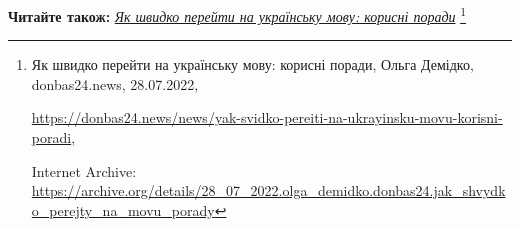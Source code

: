  
 
 
 
 


\textbf{Читайте також:} \href{https://archive.org/details/28_07_2022.olga_demidko.donbas24.jak_shvydko_perejty_na_movu_porady}{\emph{Як швидко перейти на українську мову: корисні поради}}%
\footnote{Як швидко перейти на українську мову: корисні поради, Ольга Демідко, donbas24.news, 28.07.2022, \par%
\url{https://donbas24.news/news/yak-svidko-pereiti-na-ukrayinsku-movu-korisni-poradi}, \par%
Internet Archive: \url{https://archive.org/details/28_07_2022.olga_demidko.donbas24.jak_shvydko_perejty_na_movu_porady}%
}
